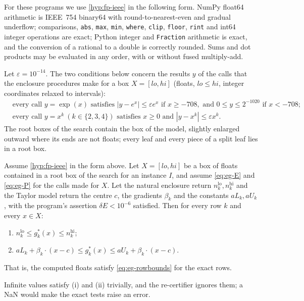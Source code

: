 For these programs we use \cref{hyp:fp-ieee} in the following form.
NumPy float64 arithmetic is IEEE~754 binary64 with round-to-nearest-even and gradual underflow; comparisons, \texttt{abs}, \texttt{max}, \texttt{min}, \texttt{where}, \texttt{clip}, \texttt{floor}, \texttt{rint} and int64 integer operations are exact; Python integer and \texttt{Fraction} arithmetic is exact, and the conversion of a rational to a double is correctly rounded.
Sums and dot products may be evaluated in any order, with or without fused multiply-add.

Let $\varepsilon=10^{-14}$.
The two conditions below concern the results $y$ of the calls that the enclosure procedures make for a box $X=[lo,hi]$ (floats, $lo\le hi$, integer coordinates relaxed to intervals):
\begin{align}
  &\text{every call } y=\exp(x)\text{ satisfies } |y-e^x|\le\varepsilon e^x \text{ if } x\ge-708, \text{ and } 0\le y\le2^{-1020} \text{ if } x<-708; \tag{E}\label{eq:eg-E}\\
  &\text{every call } y=x^k\ (k\in\{2,3,4\}) \text{ satisfies } x\ge0 \text{ and } |y-x^k|\le\varepsilon x^k. \tag{P}\label{eq:eg-P}
\end{align}
The root boxes of the search contain the box of the model, slightly enlarged outward where its ends are not floats; every leaf and every piece of a split leaf lies in a root box.

\begin{lemma}\label{lem:eg-padding}
Assume \cref{hyp:fp-ieee} in the form above.
Let $X=[lo,hi]$ be a box of floats contained in a root box of the search for an instance $I$, and assume \eqref{eq:eg-E} and \eqref{eq:eg-P} for the calls made for $X$.
Let the natural enclosure return $n^{\mathrm{lo}}_k,n^{\mathrm{hi}}_k$ and the Taylor model return the centre $c$, the gradients $\beta_k$ and the constants $aL_k,aU_k$, with the program's assertion $\delta E<10^{-6}$ satisfied.
Then for every row $k$ and every $x\in X$:
\begin{enumerate}
\item[(i)] $n^{\mathrm{lo}}_k\le g^*_k(x)\le n^{\mathrm{hi}}_k$;
\item[(ii)] $aL_k+\beta_k\cdot(x-c)\le g^*_k(x)\le aU_k+\beta_k\cdot(x-c)$.
\end{enumerate}
That is, the computed floats satisfy \eqref{eq:eg-rowbounds} for the exact rows.
\end{lemma}

Infinite values satisfy (i) and (ii) trivially, and the re-certifier ignores them; a NaN would make the exact tests raise an error.

